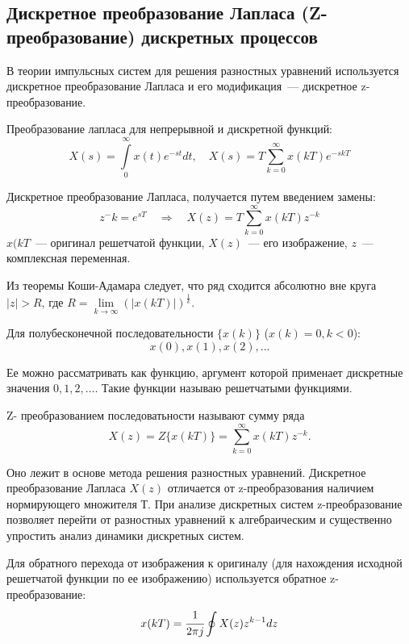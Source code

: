 \subsection{Дискретное преобразование Лапласа (Z-преобразование) дискретных процессов}

В теории импульсных систем для решения разностных уравнений используется дискретное преобразование Лапласа и его модификация~--- дискретное z-преобразование.

Преобразование лапласа для непрерывной и дискретной функций:
\begin{equation}
    X(s) = \int\limits_{0}^{\infty} x(t) e^{-st} dt, \quad  X(s) = T \sum\limits_{k=0}^{\infty} x(kT) e^{-s kT}
\end{equation}

Дискретное преобразование Лапласа, получается путем введением замены:
\begin{equation}
    z^-k = e^{sT} 
    \quad\Rightarrow\quad
    X(z) = T \sum\limits_{k=0}^{\infty} x(kT) z^{-k}
\end{equation}
$x(kT$~--- оригинал решетчатой функции, $X(z)$~--- его изображение, $z$~--- комплексная переменная.

Из теоремы Коши-Адамара следует, что ряд сходится абсолютно вне круга $|z|>R$, где $R = \lim\limits_{k \rightarrow \infty} (|x(kT)|)^{\frac{1}{k}}$.

Для полубесконечной последовательности $\{x(k)\}$ ($x(k) = 0, k < 0$):
\begin{equation}
    x(0), x(1), x(2), \dots
\end{equation}

Ее можно рассматривать как функцию, аргумент которой применает дискретные значения $0,1,2, \dots$. Такие функции называю решетчатыми функциями.

Z- преобразованием последоватьности называют сумму ряда
\begin{equation}
    X(z) = Z\{x(kT)\} = \sum\limits_{k=0}^{\infty} x(kT) z^{-k}.
\end{equation}


Оно лежит в основе метода решения разностных уравнений. Дискретное преобразование Лапласа $X(z)$ отличается от z-преобразования наличием нормирующего множителя $Т$. При анализе дискретных систем z-преобразование позволяет перейти от разностных уравнений к алгебраическим и существенно упростить анализ динамики дискретных систем.

Для обратного перехода от изображения к оригиналу (для нахождения исходной решетчатой функции по ее изображению) используется обратное z-преобразование:
\begin{equation}
    x(kT) = \cfrac{1}{2 \pi j} \oint X(z) z^{k-1} dz
\end{equation}

